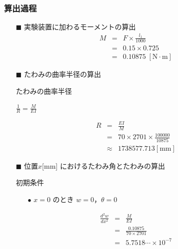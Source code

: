 \documentclass[twocolumn,a4j]{jsarticle}
\begin{document}
\subsubsection{算出過程}
\begin{itemize}
    \item [$\blacksquare$] 実験装置に加わるモーメントの算出
    \begin{eqnarray*}
        M &=& F × \frac{l_1}{1000}\\
        &=& 0.15 × 0.725\\
        &=& 0.10875 \;\left[\mathrm{N \cdot m}\right]
    \end{eqnarray*}
    \item [$\blacksquare$] たわみの曲率半径の算出
    \begin{itembox}[l]{たわみの曲率半径}
        \begin{center}
            $\displaystyle \frac{1}{R} = \frac{M}{EI}$
        \end{center}
    \end{itembox}
    \begin{eqnarray*}
        R &=& \frac{EI}{M}\\
        &=& 70 × 2701 × \frac{100000}{10875}\\
        &\approx& 1738577.713 \left[\mathrm{mm}\right]
    \end{eqnarray*}
    \item [$\blacksquare$] 位置$x$[mm] におけるたわみ角とたわみの算出
    \begin{itembox}[l]{初期条件}
    \begin{itemize}
        \item [$\bullet$] $x=0$ のとき $w=0$，$\theta =0$
    \end{itemize}
    \end{itembox}
    \begin{eqnarray*}
        \frac{d^2w}{dx^2}&=&\frac{M}{EI}\\
        &=&\frac{0.10875}{70 × 2701}\\
        &=&5.7518 \cdots × 10^{-7}\\

\end{eqnarray*}
\end{itemize}
\end{document}
